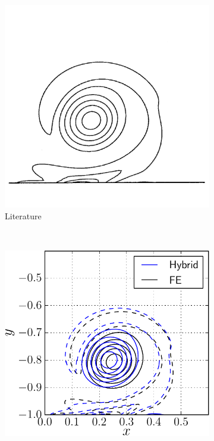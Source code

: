 	\begin{figure}[!p]
     \centering
     \begin{subfigure}[t]{0.4\textwidth}
             \includegraphics[width=\textwidth]{figures/eulerian/VorticityContourPlot-rotated270.pdf}
             \caption{Literature}
             \label{fig:hybrid_VorticityContourPlot}
     \end{subfigure}%
     ~ %
     \begin{subfigure}[t]{0.5\textwidth}
             \includegraphics[width=\textwidth]{./figures/hybrid/cbColl/hybrid_doubleMonolope_contourComparison_t1-crop.pdf}

\end{subfigure}
\end{figure}
